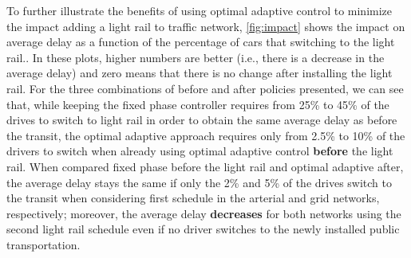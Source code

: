 To further illustrate the benefits of using optimal adaptive control to minimize
the impact adding a light rail to traffic network, \cref{fig:impact} shows the
impact on average delay as a function of the percentage of cars that switching
to the light rail..
%
In these plots, higher numbers are better (i.e., there is a decrease in the
average delay) and zero means that there is no change after installing the light
rail.
%
For the three combinations of before and after policies presented,
%
%
we can see that, while keeping the fixed phase controller requires from 25\% to
45\% of the drives to switch to light rail in order to obtain the same average
delay as before the transit, the optimal adaptive approach requires only from
2.5\% to 10\% of the drivers to switch when already using optimal adaptive
control \textbf{before} the light rail.
%
When compared fixed phase before the light rail and optimal adaptive after, the
average delay stays the same if only the 2\% and 5\% of the drives switch to the
transit when considering first schedule in the arterial and grid networks,
respectively;
%
moreover, the average delay \textbf{decreases} for both networks using the
second light rail schedule even if no driver switches to the newly installed
public transportation.
